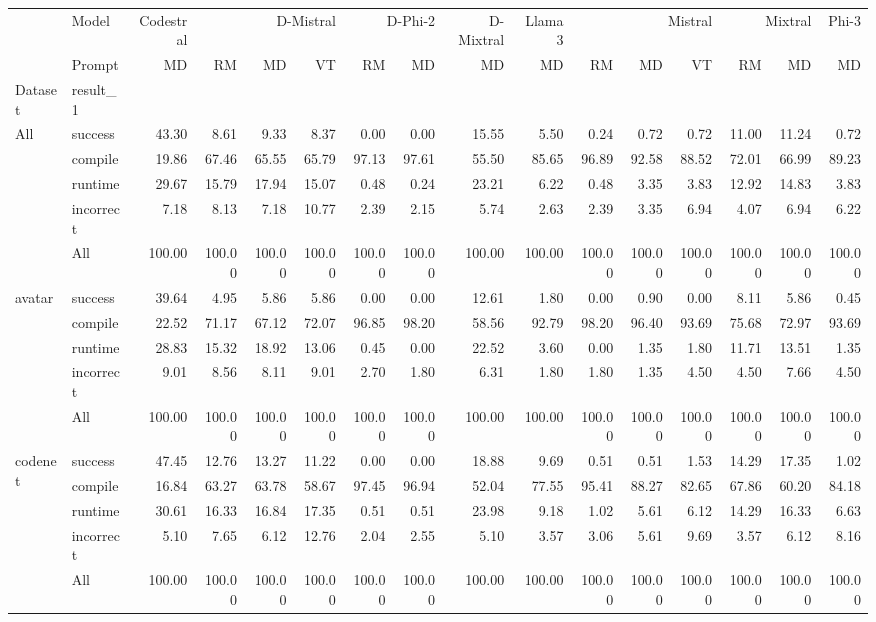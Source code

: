 \begin{tabular}{llrrrrrrrrrrrrrr}
\toprule
 & Model & Codestral & \multicolumn{3}{r}{D-Mistral} & \multicolumn{2}{r}{D-Phi-2} & D-Mixtral & Llama 3 & \multicolumn{3}{r}{Mistral} & \multicolumn{2}{r}{Mixtral} & Phi-3 \\
 & Prompt & MD & RM & MD & VT & RM & MD & MD & MD & RM & MD & VT & RM & MD & MD \\
Dataset & result_1 &  &  &  &  &  &  &  &  &  &  &  &  &  &  \\
\midrule
\multirow[t]{5}{*}{All} & success & 43.30 & 8.61 & 9.33 & 8.37 & 0.00 & 0.00 & 15.55 & 5.50 & 0.24 & 0.72 & 0.72 & 11.00 & 11.24 & 0.72 \\
 & compile & 19.86 & 67.46 & 65.55 & 65.79 & 97.13 & 97.61 & 55.50 & 85.65 & 96.89 & 92.58 & 88.52 & 72.01 & 66.99 & 89.23 \\
 & runtime & 29.67 & 15.79 & 17.94 & 15.07 & 0.48 & 0.24 & 23.21 & 6.22 & 0.48 & 3.35 & 3.83 & 12.92 & 14.83 & 3.83 \\
 & incorrect & 7.18 & 8.13 & 7.18 & 10.77 & 2.39 & 2.15 & 5.74 & 2.63 & 2.39 & 3.35 & 6.94 & 4.07 & 6.94 & 6.22 \\
 & All & 100.00 & 100.00 & 100.00 & 100.00 & 100.00 & 100.00 & 100.00 & 100.00 & 100.00 & 100.00 & 100.00 & 100.00 & 100.00 & 100.00 \\
\cline{1-16}
\multirow[t]{5}{*}{avatar} & success & 39.64 & 4.95 & 5.86 & 5.86 & 0.00 & 0.00 & 12.61 & 1.80 & 0.00 & 0.90 & 0.00 & 8.11 & 5.86 & 0.45 \\
 & compile & 22.52 & 71.17 & 67.12 & 72.07 & 96.85 & 98.20 & 58.56 & 92.79 & 98.20 & 96.40 & 93.69 & 75.68 & 72.97 & 93.69 \\
 & runtime & 28.83 & 15.32 & 18.92 & 13.06 & 0.45 & 0.00 & 22.52 & 3.60 & 0.00 & 1.35 & 1.80 & 11.71 & 13.51 & 1.35 \\
 & incorrect & 9.01 & 8.56 & 8.11 & 9.01 & 2.70 & 1.80 & 6.31 & 1.80 & 1.80 & 1.35 & 4.50 & 4.50 & 7.66 & 4.50 \\
 & All & 100.00 & 100.00 & 100.00 & 100.00 & 100.00 & 100.00 & 100.00 & 100.00 & 100.00 & 100.00 & 100.00 & 100.00 & 100.00 & 100.00 \\
\cline{1-16}
\multirow[t]{5}{*}{codenet} & success & 47.45 & 12.76 & 13.27 & 11.22 & 0.00 & 0.00 & 18.88 & 9.69 & 0.51 & 0.51 & 1.53 & 14.29 & 17.35 & 1.02 \\
 & compile & 16.84 & 63.27 & 63.78 & 58.67 & 97.45 & 96.94 & 52.04 & 77.55 & 95.41 & 88.27 & 82.65 & 67.86 & 60.20 & 84.18 \\
 & runtime & 30.61 & 16.33 & 16.84 & 17.35 & 0.51 & 0.51 & 23.98 & 9.18 & 1.02 & 5.61 & 6.12 & 14.29 & 16.33 & 6.63 \\
 & incorrect & 5.10 & 7.65 & 6.12 & 12.76 & 2.04 & 2.55 & 5.10 & 3.57 & 3.06 & 5.61 & 9.69 & 3.57 & 6.12 & 8.16 \\
 & All & 100.00 & 100.00 & 100.00 & 100.00 & 100.00 & 100.00 & 100.00 & 100.00 & 100.00 & 100.00 & 100.00 & 100.00 & 100.00 & 100.00 \\
\cline{1-16}
\bottomrule
\end{tabular}
